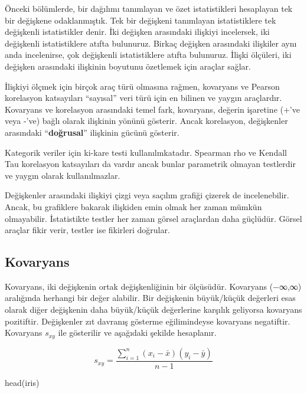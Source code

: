 \documentclass[
  letterpaper,
  DIV=11,
  numbers=noendperiod]{scrreprt}
\newenvironment{Shaded}{\begin{snugshade}}{\end{snugshade}}
\newcommand{\FunctionTok}[1]{\textcolor[rgb]{0.28,0.35,0.67}{#1}}
\newcommand{\NormalTok}[1]{\textcolor[rgb]{0.00,0.23,0.31}{#1}}
\begin{document}

Önceki bölümlerde, bir dağılımı tanımlayan ve özet istatistikleri
hesaplayan tek bir değişkene odaklanmıştık. Tek bir değişkeni tanımlayan
istatistiklere tek değişkenli istatistikler denir. İki değişken
arasındaki ilişkiyi incelersek, iki değişkenli istatistiklere atıfta
bulunuruz. Birkaç değişken arasındaki ilişkiler aynı anda incelenirse,
çok değişkenli istatistiklere atıfta bulunuruz. İlişki ölçüleri, iki
değişken arasındaki ilişkinin boyutunu özetlemek için araçlar sağlar.

İlişkiyi ölçmek için birçok araç türü olmasına rağmen, kovaryans ve
Pearson korelasyon katsayıları ``sayısal'' veri türü için en bilinen ve
yaygın araçlardır. Kovaryans ve korelasyon arasındaki temel fark,
kovaryans, değerin işaretine (+'ve veya -'ve) bağlı olarak ilişkinin
yönünü gösterir. Ancak korelasyon, değişkenler arasındaki
``\textbf{doğrusal}'' ilişkinin gücünü gösterir.

Kategorik veriler için ki-kare testi kullanılmkatadır. Spearman rho ve
Kendall Tau korelasyon katsayıları da vardır ancak bunlar parametrik
olmayan testlerdir ve yaygın olarak kullanılmazlar.

Değişkenler arasındaki ilişkiyi çizgi veya saçılım grafiği çizerek de
incelenebilir. Ancak, bu grafiklere bakarak ilişkiden emin olmak her
zaman mümkün olmayabilir. İstatistikte testler her zaman görsel
araçlardan daha güçlüdür. Görsel araçlar fikir verir, testler ise
fikirleri doğrular.

\hypertarget{kovaryans}{%
\subsection*{Kovaryans}\label{kovaryans}}

Kovaryans, iki değişkenin ortak değişkenliğinin bir ölçüsüdür. Kovaryans
(−∞,∞) aralığında herhangi bir değer alabilir. Bir değişkenin
büyük/küçük değerleri esas olarak diğer değişkenin daha büyük/küçük
değerlerine karşılık geliyorsa kovaryans pozitiftir. Değişkenler zıt
davranış gösterme eğilimindeyse kovaryans negatiftir. Kovaryans
\(s_{xy}\) ile gösterilir ve aşağıdaki şekilde hesaplanır.

\[{s}_{xy} = \frac{\sum_{i=1}^n(x_i - \bar{x})(y_i - \bar{y})}{n-1}\]

\begin{Shaded}
\begin{Highlighting}[]
\FunctionTok{head}\NormalTok{(iris)}
\end{Highlighting}
\end{Shaded}
\end{document}

